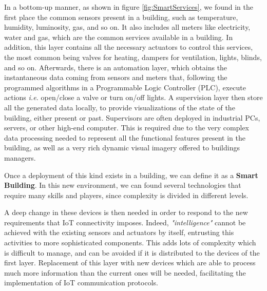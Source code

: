 
In a bottom-up manner, as shown in figure \ref{fig:SmartServices}, we found in the first place the common sensors present in a building, such as temperature, humidity, luminosity, gas, and so on. 
It also includes all meters like electricity, water and gas, which are the common services available in a building.
In addition, this layer contains all the necessary actuators to control this services, the most common being valves for heating, dampers for ventilation, lights, blinds, and so on.
Afterwards, there is an automation layer, which obtains the instantaneous data coming from sensors and meters that, following the programmed algorithms in a Programmable Logic Controller (PLC), execute actions \textit{i.e.} open/close a valve or turn on/off lights.
A supervision layer then store all the generated data locally, to provide visualizations of the state of the building, either present or past.
Supervisors are often deployed in industrial PCs, servers, or other high-end computer.
This is required due to the very complex data processing needed to represent all the functional features present in the building, as well as a very rich dynamic visual imagery offered to buildings managers.

Once a deployment of this kind exists in a building, we can define it as a \textbf{Smart Building}.
In this new environment, we can found several technologies that require many skills and players, since complexity is divided in different levels.

A deep change in these devices is then needed in order to respond to the new requirements that IoT connectivity imposes.
Indeed, \textit{"intelligence"} cannot be achieved with the existing sensors and actuators by itself, entrusting this activities to more sophisticated components.
This adds lots of complexity which is difficult to manage, and can be avoided if it is distributed to the devices of the first layer.
Replacement of this layer with new devices which are able to process much more information than the current ones will be needed, facilitating the implementation of IoT communication protocols.

